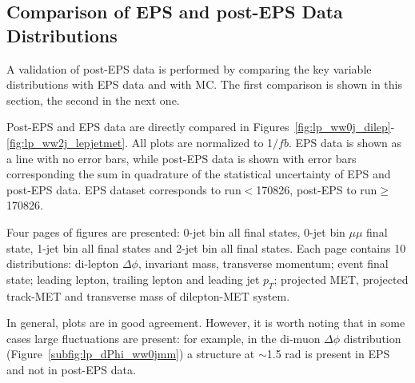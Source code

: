 
\subsection{Comparison of EPS and post-EPS Data Distributions}
A validation of post-EPS data is performed by comparing the key variable distributions with EPS data and with MC.
The first comparison is shown in this section, the second in the next one.

Post-EPS and EPS data are directly compared in Figures~\ref{fig:lp_ww0j_dilep}-\ref{fig:lp_ww2j_lepjetmet}. 
All plots are normalized to 1$/fb$. 
EPS data is shown as a line with no error bars, while post-EPS data is shown with error bars corresponding the sum in quadrature of the 
statistical uncertainty of EPS and post-EPS data. 
EPS dataset corresponds to run$<$170826, post-EPS to run$\geq$170826.

Four pages of figures are presented: 0-jet bin all final states, 0-jet bin $\mu\mu$ final state, 1-jet bin all final states and 2-jet bin all final states. 
Each page contains 10 distributions: di-lepton $\Delta\phi$, invariant mass, transverse momentum; event final state; leading lepton, trailing lepton 
and leading jet $p_T$; projected MET, projected track-MET and transverse mass of dilepton-MET system.

In general, plots are in good agreement. However, it is worth noting that in some cases large fluctuations are present: for example, in the di-muon   
$\Delta\phi$ distribution (Figure~\ref{subfig:lp_dPhi_ww0jmm}) a structure at $\sim$1.5 rad is present in EPS and not in post-EPS data.

\clearpage

